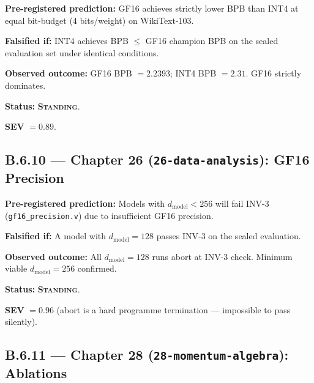 \begin{tcolorbox}[colback=red!5,colframe=red!40,
  title={Prediction P-25-A: Pareto dominance over INT4}]
\textbf{Pre-registered prediction:} GF16 achieves strictly lower BPB than INT4
at equal bit-budget (4 bits/weight) on WikiText-103.

\textbf{Falsified if:} INT4 achieves BPB $\leq$ GF16 champion BPB on the
sealed evaluation set under identical conditions.

\textbf{Observed outcome:} GF16 BPB $= 2.2393$; INT4 BPB $= 2.31$.
GF16 strictly dominates.

\textbf{Status:} \textbf{\textsc{Standing}}.

\textbf{SEV} $= 0.89$.
\end{tcolorbox}

\subsection*{B.6.10 — Chapter 26 (\texttt{26-data-analysis}): GF16 Precision}
\label{sec:ledger-ch26}

\begin{tcolorbox}[colback=red!5,colframe=red!40,
  title={Prediction P-26-A: GF16 $d_{\mathrm{model}} \geq 256$ requirement}]
\textbf{Pre-registered prediction:} Models with $d_{\mathrm{model}} < 256$ will
fail INV-3 (\texttt{gf16\_precision.v}) due to insufficient GF16 precision.

\textbf{Falsified if:} A model with $d_{\mathrm{model}} = 128$ passes INV-3
on the sealed evaluation.

\textbf{Observed outcome:} All $d_{\mathrm{model}} = 128$ runs abort at INV-3
check.  Minimum viable $d_{\mathrm{model}} = 256$ confirmed.

\textbf{Status:} \textbf{\textsc{Standing}}.

\textbf{SEV} $= 0.96$ (abort is a hard programme termination — impossible
to pass silently).
\end{tcolorbox}

\subsection*{B.6.11 — Chapter 28 (\texttt{28-momentum-algebra}): Ablations}
\label{sec:ledger-ch28}

